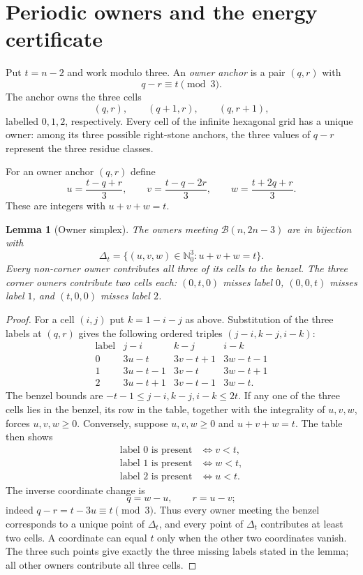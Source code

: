 \documentclass[11pt]{amsart}
\newtheorem{lemma}[theorem]{Lemma}
\theoremstyle{definition}
\newcommand{\Bz}{\mathcal B}
\begin{document}
\section{Periodic owners and the energy certificate}

Put $t=n-2$ and work modulo three.  An \emph{owner anchor} is a pair
$(q,r)$ with
\[
 q-r\equiv t\pmod3.
\]
The anchor owns the three cells
\[
 (q,r),\qquad(q+1,r),\qquad(q,r+1),
\]
labelled $0,1,2$, respectively.  Every cell of the infinite hexagonal grid
has a unique owner: among its three possible right-stone anchors, the three
values of $q-r$ represent the three residue classes.

For an owner anchor $(q,r)$ define
\begin{equation}\label{eq:owner-coordinates}
 u=\frac{t-q+r}{3},\qquad
 v=\frac{t-q-2r}{3},\qquad
 w=\frac{t+2q+r}{3}.
\end{equation}
These are integers with $u+v+w=t$.

\begin{lemma}[Owner simplex]\label{lem:owner-simplex}
The owners meeting $\Bz(n,2n-3)$ are in bijection with
\[
 \Delta_t=\{(u,v,w)\in\mathbb N_0^3:u+v+w=t\}.
\]
Every non-corner owner contributes all three of its cells to the benzel.  The
three corner owners contribute two cells each: $(0,t,0)$ misses label $0$,
$(0,0,t)$ misses label $1$, and $(t,0,0)$ misses label $2$.
\end{lemma}

\begin{proof}
For a cell $(i,j)$ put $k=1-i-j$ as above.  Substitution of the three labels
at $(q,r)$ gives the following ordered triples
$(j-i,k-j,i-k)$:
\[
\begin{array}{c|ccc}
\text{label}&j-i&k-j&i-k\\ \hline
0&3u-t&3v-t+1&3w-t-1\\
1&3u-t-1&3v-t&3w-t+1\\
2&3u-t+1&3v-t-1&3w-t.
\end{array}
\]
The benzel bounds are $-t-1\leq j-i,k-j,i-k\leq2t$.  If any one of the
three cells lies in the benzel, its row in the table, together with the
integrality of $u,v,w$, forces $u,v,w\geq0$.  Conversely, suppose
$u,v,w\geq0$ and $u+v+w=t$.  The table then shows
\begin{align*}
 \text{label }0\text{ is present}&\iff v<t,\\
 \text{label }1\text{ is present}&\iff w<t,\\
 \text{label }2\text{ is present}&\iff u<t.
\end{align*}
The inverse coordinate change is
\[
 q=w-u,\qquad r=u-v;
\]
indeed $q-r=t-3u\equiv t\pmod3$.  Thus every owner meeting the benzel
corresponds to a unique point of $\Delta_t$, and every point of $\Delta_t$
contributes at least two cells.
A coordinate can equal $t$ only when the other two coordinates vanish.  The
three such points give exactly the three missing labels stated in the lemma;
all other owners contribute all three cells.
\end{proof}
\end{document}
